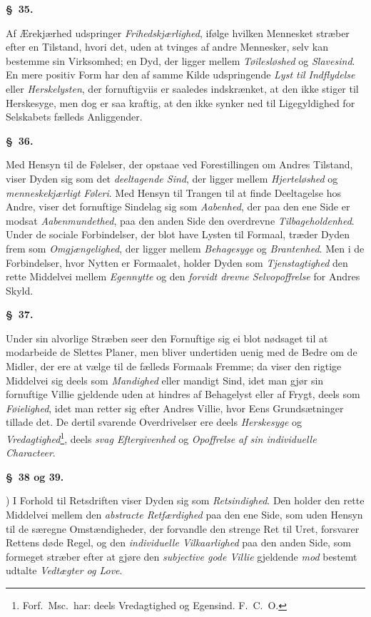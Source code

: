 \documentclass[12pt]{article}
\newcommand{\opage}[1]{\marginnote{\footnotesize\textit{[#1]}}}
\newcommand{\slaw}[1]{\par\medskip\begin{center}\textbf{\S~#1.}\end{center}\nopagebreak}
\begin{document}
\slaw{35}
Af Ærekjærhed udspringer \emph{Frihedskjærlighed}, ifølge hvilken Mennesket stræber efter en Tilstand, hvori det, uden at tvinges af andre Mennesker, selv kan bestemme sin Virksomhed; en Dyd, der ligger mellem \emph{Tøilesløshed} og \emph{Slavesind}. En mere positiv Form har den af samme Kilde udspringende \emph{Lyst til Indflydelse} eller \emph{Herskelysten}, der fornuftigviis er saaledes indskrænket, at den ikke stiger til Herskesyge, men dog er saa kraftig, at den ikke synker ned til Ligegyldighed for Selskabets fælleds Anliggender.

\slaw{36}
Med Hensyn til de Følelser, der opstaae ved Forestillingen om Andres Tilstand, viser Dyden sig som det \emph{deeltagende Sind}, der ligger mellem \emph{Hjerteløshed} og \emph{menneskekjærligt Føleri}. Med Hensyn til Trangen til at finde Deeltagelse hos Andre, viser det fornuftige Sindelag sig som \emph{Aabenhed}, der paa den ene Side er modsat \emph{Aabenmundethed}, paa den anden Side den overdrevne \emph{Tilbageholdenhed}. Under de \opage{158}sociale Forbindelser, der blot have Lysten til Formaal, træder Dyden frem som \emph{Omgjængelighed}, der ligger mellem \emph{Behagesyge} og \emph{Brantenhed}. Men i de Forbindelser, hvor Nytten er Formaalet, holder Dyden som \emph{Tjenstagtighed} den rette Middelvei mellem \emph{Egennytte} og den \emph{forvidt drevne Selvopoffrelse} for Andres Skyld.

\slaw{37}
Under sin alvorlige Stræben seer den Fornuftige sig ei blot nødsaget til at modarbeide de Slettes Planer, men bliver undertiden uenig med de Bedre om de Midler, der ere at vælge til de fælleds Formaals Fremme; da viser den rigtige Middelvei sig deels som \emph{Mandighed} eller mandigt Sind, idet man gjør sin fornuftige Villie gjeldende uden at hindres af Behagelyst eller af Frygt, deels som \emph{Føielighed}, idet man retter sig efter Andres Villie, hvor Eens Grundsætninger tillade det. De dertil svarende Overdrivelser ere deels \emph{Herskesyge} og \emph{Vredagtighed}\footnote{Forf.\ Msc.\ har: deels Vredagtighed og Egensind. F.\ C.\ O.}, deels \emph{svag Eftergivenhed} og \emph{Opoffrelse af sin individuelle Characteer}.

\slaw{38 og 39}
1) I Forhold til Retsdriften viser Dyden sig som \emph{Retsindighed}. Den holder den rette Middelvei mellem den \emph{abstracte Retfærdighed} paa den ene Side, som uden Hensyn til de særegne Omstændigheder, der forvandle den strenge Ret til Uret, forsvarer Rettens døde Regel, og den \emph{individuelle Vilkaarlighed} paa den anden Side, som formeget stræber efter at gjøre den \emph{subjective gode Villie} gjeldende \emph{mod} bestemt udtalte \emph{Vedtægter og Love}.
\end{document}
